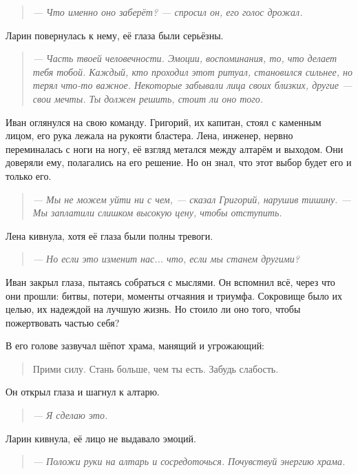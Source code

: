 \documentclass[12pt,a4paper]{book}
\newenvironment{dialogue}{\begin{quote}\itshape}{\end{quote}}
\begin{document}
\begin{dialogue}
--- Что именно оно заберёт? --- спросил он, его голос дрожал.
\end{dialogue}

Ларин повернулась к нему, её глаза были серьёзны.

\begin{dialogue}
--- Часть твоей человечности. Эмоции, воспоминания, то, что делает тебя тобой. Каждый, кто проходил этот ритуал, становился сильнее, но терял что-то важное. Некоторые забывали лица своих близких, другие --- свои мечты. Ты должен решить, стоит ли оно того.
\end{dialogue}

Иван оглянулся на свою команду. Григорий, их капитан, стоял с каменным лицом, его рука лежала на рукояти бластера. Лена, инженер, нервно переминалась с ноги на ногу, её взгляд метался между алтарём и выходом. Они доверяли ему, полагались на его решение. Но он знал, что этот выбор будет его и только его.

\begin{dialogue}
--- Мы не можем уйти ни с чем, --- сказал Григорий, нарушив тишину. --- Мы заплатили слишком высокую цену, чтобы отступить.
\end{dialogue}

Лена кивнула, хотя её глаза были полны тревоги.

\begin{dialogue}
--- Но если это изменит нас... что, если мы станем другими?
\end{dialogue}

Иван закрыл глаза, пытаясь собраться с мыслями. Он вспомнил всё, через что они прошли: битвы, потери, моменты отчаяния и триумфа. Сокровище было их целью, их надеждой на лучшую жизнь. Но стоило ли оно того, чтобы пожертвовать частью себя?

В его голове зазвучал шёпот храма, манящий и угрожающий:

\begin{quote}
Прими силу. Стань больше, чем ты есть. Забудь слабость.
\end{quote}

Он открыл глаза и шагнул к алтарю.

\begin{dialogue}
--- Я сделаю это.
\end{dialogue}

Ларин кивнула, её лицо не выдавало эмоций.

\begin{dialogue}
--- Положи руки на алтарь и сосредоточься. Почувствуй энергию храма.
\end{dialogue}
\end{document}
